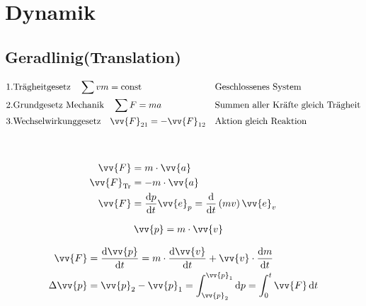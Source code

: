 \section{Dynamik}
\subsection{Geradlinig(Translation)}
\begin{boxshaded}
\begin{align*}
&\text{1.Trägheitgesetz}\quad \sum{vm}=\text{const}& &\text{Geschlossenes System} \\
&\text{2.Grundgesetz Mechanik}\quad \sum{F}=ma& &\text{Summen aller Kräfte gleich Trägheit} \\
&\text{3.Wechselwirkunggesetz}\quad \vv{F}_{21}=-\vv{F}_{12}& &\text{Aktion gleich Reaktion} 
\end{align*}
\end{boxshaded}

\begin{boxleft}
\\
\end{boxleft}\begin{boxrightshaded}
\begin{align*}
\vv{F}&=m\cdot \vv{a}\\
\vv{F}_{\text{Tr}}&=-m\cdot \vv{a}\\
\vv{F}&=\frac{\diff p}{\diff t}\vv{e}_p=\frac{\diff}{\diff t}\left(mv\right)\vv{e}_v
\end{align*}
\end{boxrightshaded}

\begin{boxleft}
\end{boxleft}\begin{boxrightshaded}
\begin{align*}
\vv{p}&=m\cdot \vv{v}
\end{align*}
\end{boxrightshaded}

\begin{boxleft}
\end{boxleft}\begin{boxrightshaded}
\begin{align*}
\vv{F}&=\frac{\diff \vv{p}}{\diff t}=m\cdot\frac{\diff \vv{v}}{\diff t}+\vv{v}\cdot\frac{\diff m}{\diff t}\\
\Delta\vv{p}&=\vv{p}_2-\vv{p}_1=\int_{\vv{p}_2}^{\vv{p}_1}\diff p=\int_0^{t}\vv{F}\diff t
\end{align*}
\end{boxrightshaded}

